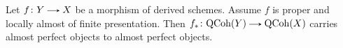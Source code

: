 \begin{claim}
  \label{derived-proper-pushforward}
  Let $f \c Y \to X$ be a morphism of derived schemes. Assume $f$ is proper and locally almost of finite presentation. Then $f_* \c \QCoh(Y) \to \QCoh(X)$ carries almost perfect objects to almost perfect objects.
\end{claim}


% 
% 


